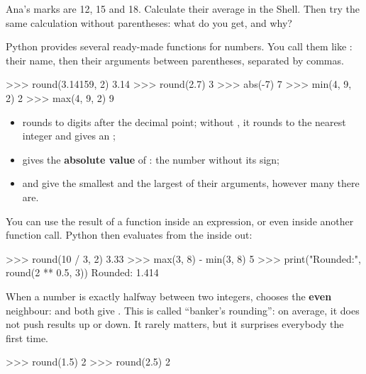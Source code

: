 \begin{atoi}
Ana's marks are 12, 15 and 18. Calculate their average in the Shell. Then try the same calculation
without parentheses: what do you get, and why?
\end{atoi}


Python provides several ready-made functions for numbers. You call them like : their
name, then their arguments between parentheses, separated by commas.

\begin{console}
>>> round(3.14159, 2)
3.14
>>> round(2.7)
3
>>> abs(-7)
7
>>> min(4, 9, 2)
2
>>> max(4, 9, 2)
9
\end{console}

\begin{itemize}
\item {} rounds  to  digits after the decimal point; without , it
  rounds to the nearest integer and gives an ;
\item {} gives the \textbf{absolute value} of : the number without its sign;
\item {} and  give the smallest and the largest of their arguments, however many
  there are.
\end{itemize}

You can use the result of a function inside an expression, or even inside another function call.
Python then evaluates from the inside out:

\begin{console}
>>> round(10 / 3, 2)
3.33
>>> max(3, 8) - min(3, 8)
5
>>> print("Rounded:", round(2 ** 0.5, 3))
Rounded: 1.414
\end{console}

\begin{attention}
When a number is exactly halfway between two integers,  chooses the \textbf{even}
neighbour:  and  both give . This is called \enquote{banker's
rounding}: on average, it does not push results up or down. It rarely matters, but it surprises
everybody the first time.
\begin{console}
>>> round(1.5)
2
>>> round(2.5)
2
\end{console}
\end{attention}

